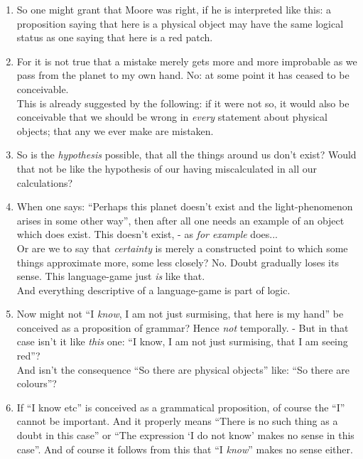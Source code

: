 \documentclass{book}
\begin{document}
\begin{enumerate}
\item
So one might grant that Moore was right, if he is interpreted like this: a
proposition saying that here is a physical object may have the same logical
status as one saying that here is a red patch.

\item
For it is not true that a mistake merely gets more and more improbable as we
pass from the planet to my own hand. No: at some point it has ceased to be
conceivable. \\
This is already suggested by the following: if it were not so, it would also be
conceivable that we should be wrong in \emph{every} statement about physical
objects; that any we ever make are mistaken.

\item
So is the \emph{hypothesis} possible, that all the things around us don't
exist? Would that not be like the hypothesis of our having miscalculated in all
our calculations?

\item
When one says: ``Perhaps this planet doesn't exist and the light-phenomenon
arises in some other way'', then after all one needs an example of an object
which does exist. This doesn't exist, - as \emph{for example} does... \\
Or are we to say that \emph{certainty} is merely a constructed point to which
some things approximate more, some less closely? No. Doubt gradually loses its
sense. This language-game just \emph{is} like that. \\ 
And everything descriptive of a language-game is part of logic.

\item
Now might not ``I \emph{know}, I am not just surmising, that here is my hand''
be conceived as a proposition of grammar? Hence \emph{not} temporally. - But in
that case isn't it like \emph{this} one: ``I know, I am not just surmising,
that I am seeing red''? \\
And isn't the consequence ``So there are physical objects'' like: ``So there
are colours''?

\item
If ``I know etc'' is conceived as a grammatical proposition, of course the
``I'' cannot be important. And it properly means ``There is no such thing as a
doubt in this case'' or ``The expression `I do not know' makes no sense in this
case''. And of course it follows from this that ``I \emph{know}'' makes no
sense either.


\end{enumerate}
\end{document}
